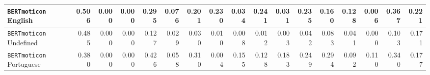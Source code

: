 \begin{tabular}{lrrrrrrrrrrrrrrrr}
 \hline
\texttt{BERTmoticon} English & 0.506 & 0.000 & 0.000 & 0.295 & 0.076 & 0.201 & 0.230 & 0.034 & 0.241 & 0.031 & 0.235 & 0.160 & 0.128 & 0.006 & 0.367 & 0.221  \\ 
 \hline
\texttt{BERTmoticon} Undefined & 0.485 & 0.000 & 0.000 & 0.127 & 0.029 & 0.030 & 0.010 & 0.008 & 0.012 & 0.003 & 0.042 & 0.083 & 0.041 & 0.000 & 0.103 & 0.171  \\ 
 \hline
\texttt{BERTmoticon}  Portuguese & 0.380 & 0.000 & 0.000 & 0.426 & 0.058 & 0.310 & 0.004 & 0.155 & 0.128 & 0.183 & 0.249 & 0.294 & 0.092 & 0.110 & 0.340 & 0.177 \\ 
 \hline
\end{tabular}
